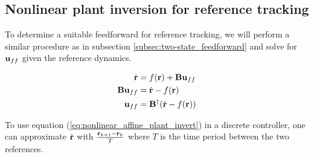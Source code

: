 \subsection{Nonlinear plant inversion for reference tracking}

To determine a suitable feedforward for \gls{reference} tracking, we will
perform a similar procedure as in subsection \ref{subsec:two-state_feedforward}
and solve for $\mathbf{u}_{ff}$ given the \gls{reference} dynamics.

\begin{align}
  \dot{\mathbf{r}} &= f(\mathbf{r}) + \mathbf{B}\mathbf{u}_{ff} \nonumber \\
  \mathbf{B}\mathbf{u}_{ff} &= \dot{\mathbf{r}} - f(\mathbf{r}) \nonumber \\
  \mathbf{u}_{ff} &= \mathbf{B}^\dagger (\dot{\mathbf{r}} - f(\mathbf{r}))
    \label{eq:nonlinear_affine_plant_invert}
\end{align}

\begin{remark}
  To use equation (\ref{eq:nonlinear_affine_plant_invert}) in a discrete
  controller, one can approximate $\dot{\mathbf{r}}$ with
  $\frac{\mathbf{r}_{k + 1} - \mathbf{r}_k}{T}$ where $T$ is the time period between
  the two \glspl{reference}.
\end{remark}
